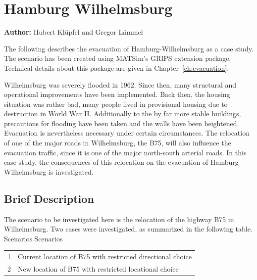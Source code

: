 
%
\section{Hamburg Wilhelmsburg}
\label{ch:sc:hhw}
\hfill \textbf{Author:} Hubert Klüpfel and Gregor Lämmel

The following describes the evacuation of Hamburg-Wilhelmsburg as a case study. 
The scenario has been created using MATSim's GRIPS extension package. Technical details about this package are given in Chapter~\ref{ch:evacuation}. 

Wilhelmsburg was severely flooded in 1962. Since then, many structural and operational improvements have been implemented. Back then, the housing situation was rather bad, many people lived in provisional housing due to destruction in World War II. Additionally to the by far more stable buildings, precautions for flooding have been taken and the walls have been heightened. Evacuation is nevertheless necessary under certain circumstances. The relocation of one of the major roads in Wilhelmsburg, the B75, will also influence the evacuation traffic, since it is one of the major north-south arterial roads. In this case study, the consequences of this relocation on the evacuation of Hamburg-Wilhelmsburg is investigated.

\subsection{Brief Description}

The scenario to be investigated here is the relocation of the highway B75 in Wilhelmsburg. 
Two cases were investigated, as summarized in the following table.
%
\createtable%
	{Scenarios}%
	{Scenarios}%
	{\label{table:b75scenarios}}%
	{%
	\begin{tabular}{|l | l|}
	\hline
	1 & Current location of B75 with restricted directional choice\\
	2 & New location of B75 with restricted locational choice\\
	\hline
\end{tabular}
}%
{}%

